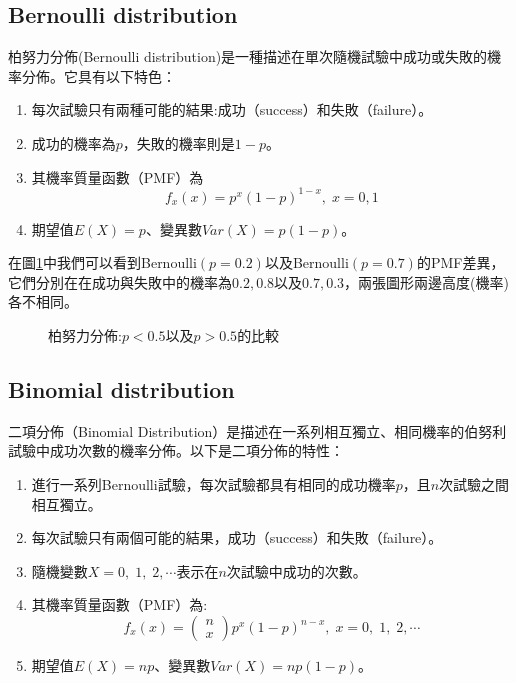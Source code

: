 \documentclass[12pt, a4paper]{article}
\begin{document}
\subsection{Bernoulli distribution}
柏努力分佈(Bernoulli distribution)是一種描述在單次隨機試驗中成功或失敗的機率分佈。它具有以下特色\;：
\begin{enumerate}
\item 每次試驗只有兩種可能的結果\;:\;成功（success）和失敗（failure）。
\item 成功的機率為\;$p$\;，失敗的機率則是\;$1−p$\;。
\item 其機率質量函數（PMF）為$$f_x(x)=p^x(1-p)^{1-x},\;x=0,1$$
\item 期望值\;$E(X)=p$\;、變異數\;$Var(X)=p(1-p)$\;。
\end{enumerate}

在圖\;\ref{fig:parallel3_4}\;中我們可以看到\;Bernoulli$(p=0.2)$\;以及\;Bernoulli$(p=0.7)$\;的PMF差異，它們分別在在成功與失敗中的機率為\;$0.2,0.8$\;以及\;$0.7,0.3$\;，兩張圖形兩邊高度(機率)各不相同。

\begin{figure}[H]
\centering
{}
\caption{柏努力分佈\;:\;$p<0.5$以及$p>0.5$的比較}
\label{fig:parallel3_4}
\end{figure}

\subsection{Binomial distribution}
二項分佈（Binomial Distribution）是描述在一系列相互獨立、相同機率的伯努利試驗中成功次數的機率分佈。以下是二項分佈的特性\;：
\begin{enumerate}
\item 進行一系列Bernoulli試驗，每次試驗都具有相同的成功機率\;$p$\;，且\;$n$\;次試驗之間相互獨立。
\item 每次試驗只有兩個可能的結果，成功（success）和失敗（failure）。
\item 隨機變數\;$X=0,\;1,\;2,\cdots$\;表示在\;$n$\;次試驗中成功的次數。
\item 其機率質量函數（PMF）為\;:
$$f_x(x)=\left(\begin{array}{c}n\\ x\end{array}\right)p^x(1-p)^{n-x},\;x=0,\;1,\;2,\cdots$$
\item 期望值\;$E(X)=np$\;、變異數\;$Var(X)=np(1−p)$\;。
\end{enumerate}
\end{document}
